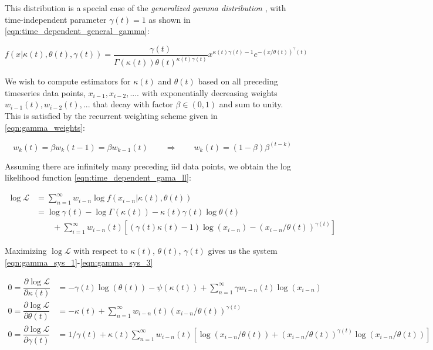 \documentclass[12pt]{article}
\begin{document}
\noindent This distribution is a special case of the \textit{generalized gamma distribution} \label{eqn:time_dependent_general_gamma}, with time-independent parameter $\gamma(t) = 1$ as shown in \eqref{eqn:time_dependent_general_gamma}:

\begin{equation}
f(x|\kappa(t), \theta(t), \gamma(t)) = \frac{\gamma(t)}{\Gamma(\kappa(t))\theta(t)^{\kappa(t)\gamma(t)}} x^{\kappa(t)\gamma(t)-1}e^{-(x/\theta(t))^\gamma(t)}
\end{equation}

\noindent We wish to compute estimators for $\kappa(t)$ and $\theta(t)$ based on all preceding timeseries data points, $x_{i-1}, x_{i-2}, ....$ with exponentially decreasing weights $w_{i-1}(t), w_{i-2}(t), ...$ that decay with factor $\beta \in (0, 1)$ and sum to unity. This is satisfied by the recurrent weighting scheme given in \eqref{eqn:gamma_weights}:

\begin{equation}
w_{k}(t) = \beta w_{k}(t-1) = \beta w_{k-1}(t) \qquad\Rightarrow\qquad w_{k}(t) = (1-\beta)\beta^{(t-k)}
\label{eqn:gamma_weights}
\end{equation} 

\noindent Assuming there are infinitely many preceding iid data points, we obtain the log likelihood function \eqref{eqn:time_dependent_gama_ll}:

\begin{align}
\log \mathcal{L} & = \sum_{n=1}^\infty w_{i-n}\log f(x_{i-n}|\kappa(t), \theta(t)) \nonumber\\
& = \log \gamma(t) - \log\Gamma(\kappa(t)) - \kappa(t)\gamma(t)\log \theta(t) \nonumber \\ 
& \qquad +\sum_{i=1}^\infty w_{i-n}(t)[(\gamma(t)\kappa(t) - 1)\log(x_{i-n}) - (x_{i-n}/\theta(t))^{\gamma(t)}]
\label{eqn:time_dependent_gama_ll}
\end{align}

\noindent Maximizing $\log\mathcal{L}$ with respect to $\kappa(t)$, $\theta(t)$, $\gamma(t)$ gives us the system \eqref{eqn:gamma_sys_1}-\eqref{eqn:gamma_sys_3}

\begin{align}
0 = \dfrac{\partial \log\mathcal{L}}{\partial \kappa(t)} &= -\gamma(t)\log(\theta(t)) - \psi(\kappa(t)) + \sum_{n=1}^\infty \gamma w_{i-n}(t) \log(x_{i-n})  \label{eqn:gamma_sys_1}\\
0 = \dfrac{\partial \log\mathcal{L}}{\partial \theta(t)} &= -\kappa(t) + \sum_{n=1}^\infty w_{i-n}(t) (x_{i-n}/\theta(t))^{\gamma(t)} \label{eqn:gamma_sys_2}\\
0 = \dfrac{\partial \log\mathcal{L}}{\partial \gamma(t)} &= 1/\gamma(t) + \kappa(t)\sum_{n=1}^\infty w_{i-n}(t)\left[ \log(x_{i-n}/\theta(t)) + (x_{i-n}/\theta(t))^{\gamma(t)}\log(x_{i-n}/\theta(t)) \right] \label{eqn:gamma_sys_3}
\end{align}
\end{document}
